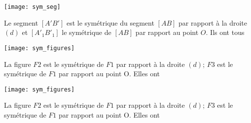 \documentclass[12pt,a4paper]{article}
\begin{document}
\begin{myex}
	\begin{center}
		\texttt{[image: sym\_seg]}
	\end{center}
	
	Le segment $[A'B']$ est le symétrique du segment $[AB]$ par rapport à la droite $(d)$ et $[A'_1B'_1]$ le symétrique de $[AB]$ par rapport au point $O$. 
	Ils ont tous \\
	
	
\end{myex}

\begin{myex}
	\begin{center}
		\texttt{[image: sym\_figures]}
	\end{center}
	
	La figure $F2$ est le symétrique de $F1$ par rapport à la droite $(d)$; $F3$ est le symétrique de $F1$ par rapport au point O.
	Elles ont \\
\end{myex}

\begin{myex}
	\begin{center}
		\texttt{[image: sym\_figures]}
	\end{center}
	
	La figure $F2$ est le symétrique de $F1$ par rapport à la droite $(d)$; $F3$ est le symétrique de $F1$ par rapport au point O.
	Elles ont \\
\end{myex}
\end{document}
